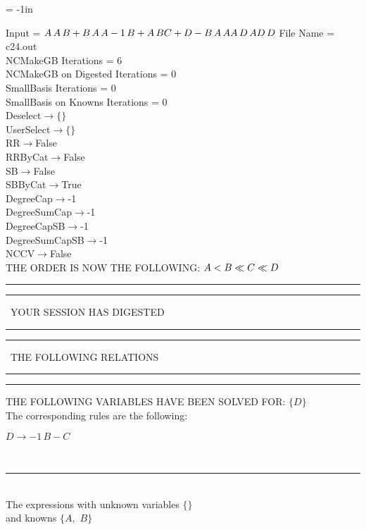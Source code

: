 \voffset = -1in
\evensidemargin 0.1in
\oddsidemargin 0.1in
\textheight 9in
\textwidth 6in

\normalsize
\baselineskip=12pt
\noindent
Input = 
$
\\A\,
 A\,
 B + B\,
 A\,
 A\\
-1\,
 B + A\,
 B\\
C + D - B\,
 A\,
 A\\
A\,
 D\,
 A\\
D\,
 D\\
$
File Name = c24.out\\
NCMakeGB Iterations = 6\\
NCMakeGB on Digested Iterations = 0\\
SmallBasis Iterations = 0\\
SmallBasis on Knowns Iterations = 0\\
Deselect$\rightarrow \{\}$\\
UserSelect$\rightarrow \{\}$\\
RR$\rightarrow $False\\
RRByCat$\rightarrow $False\\
SB$\rightarrow $False\\
SBByCat$\rightarrow $True\\
DegreeCap$\rightarrow $-1\\
DegreeSumCap$\rightarrow $-1\\
DegreeCapSB$\rightarrow $-1\\
DegreeSumCapSB$\rightarrow $-1\\
NCCV$\rightarrow $False\\
THE ORDER IS NOW THE FOLLOWING:\hfil\break
$
A<B\ll
C\ll
D\\
$
\rule[2pt]{6in}{4pt}\hfil\break
\rule[2pt]{1.879in}{4pt}
\ YOUR SESSION HAS DIGESTED\ 
\rule[2pt]{1.879in}{4pt}\hfil\break
\rule[2pt]{1.923in}{4pt}
\ THE FOLLOWING RELATIONS\ 
\rule[2pt]{1.923in}{4pt}\hfil\break
\rule[2pt]{6in}{4pt}\hfil\break
THE FOLLOWING VARIABLES HAVE BEEN SOLVED FOR:\hfil\break
$\{D\}$
\smallskip\\
The corresponding rules are the following:\smallskip\\
\begin{minipage}{6in}
$
D\rightarrow -1\,
 B - C
$
\end{minipage}\medskip\\
\rule[3pt]{6in}{.7pt}\\
The expressions with unknown variables $\{\}$\\
and knowns $\{A,
$ $
B\}$\smallskip\\

